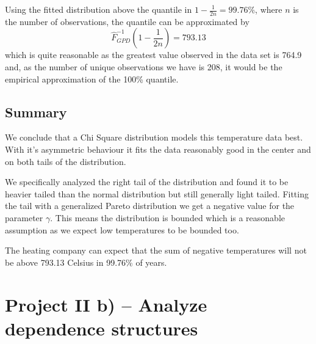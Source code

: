 \documentclass[11pt]{article}
\begin{document}
Using the fitted distribution above the quantile in $1-\frac{1}{2n} = 99.76\%$, where $n$ is the number of observations, the quantile can be approximated by
\[
\hat F_{GPD}^{-1}(1-\frac{1}{2n}) = 793.13
\]
which is quite reasonable as the greatest value observed in the data set is 764.9 and, as the number of unique observations we have is 208, it would be the empirical approximation of the 100\% quantile.

\subsection*{Summary}


We conclude that a Chi Square distribution models this temperature data best. With it's asymmetric behaviour it fits the data reasonably good in the center and on both tails of the distribution. 

We specifically analyzed the right tail of the distribution and found it to be heavier tailed than the normal distribution but still generally light tailed. 
Fitting the tail with a generalized Pareto distribution we get a negative value for the parameter $\gamma$. This means the distribution is bounded which is a reasonable assumption as we expect low temperatures to be bounded too.

The heating company can expect that the sum of negative temperatures will not be above 793.13 Celsius in  99.76\% of years.
\pagebreak

\section*{Project II b) -- Analyze dependence structures}
\end{document}
